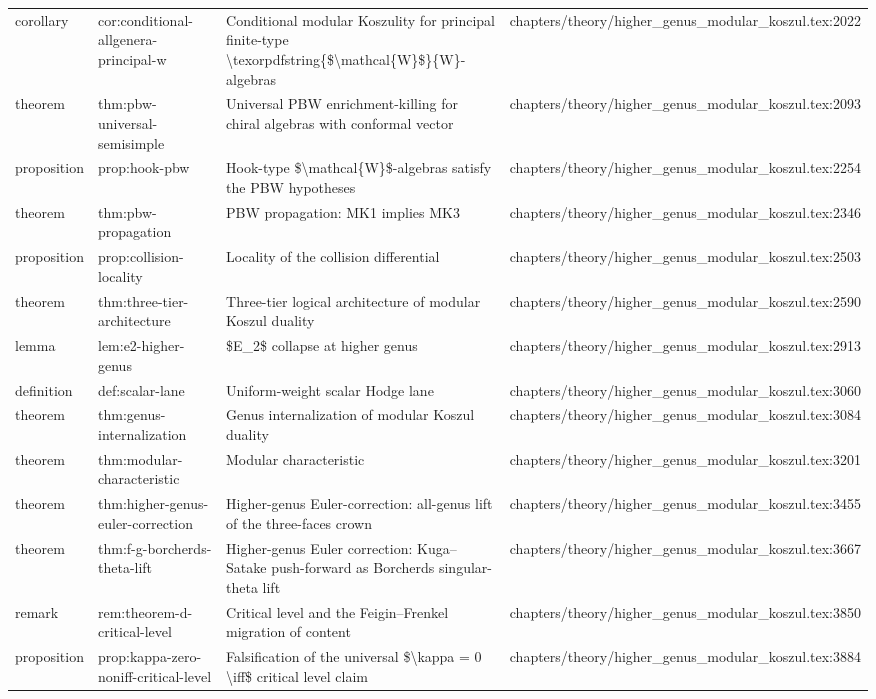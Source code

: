\documentclass[11pt]{article}
\begin{document}
\begin{longtable}{L{0.10\textwidth}L{0.26\textwidth}L{0.42\textwidth}L{0.22\textwidth}}
corollary & cor:cond{}itional-allgenera-principal-w & Cond{}itional modular Koszulity for principal finite-type \textbackslash{}texorpdfstring\{\$\textbackslash{}mathcal\{W\}\$\}\{W\}-algebras & chapters/theory/higher\_genus\_modular\_koszul.tex:2022\\
theorem & thm:pbw-universal-semisimple & Universal PBW enrichment-killing for chiral algebras with conformal vector & chapters/theory/higher\_genus\_modular\_koszul.tex:2093\\
proposition & prop:hook-pbw & Hook-type \$\textbackslash{}mathcal\{W\}\$-algebras satisfy the PBW hypotheses & chapters/theory/higher\_genus\_modular\_koszul.tex:2254\\
theorem & thm:pbw-propagation & PBW propagation: MK1 implies MK3 & chapters/theory/higher\_genus\_modular\_koszul.tex:2346\\
proposition & prop:collision-locality & Locality of the collision differential & chapters/theory/higher\_genus\_modular\_koszul.tex:2503\\
theorem & thm:three-tier-architecture & Three-tier logical architecture of modular Koszul duality & chapters/theory/higher\_genus\_modular\_koszul.tex:2590\\
lemma & lem:e2-higher-genus & \$E\_2\$ collapse at higher genus & chapters/theory/higher\_genus\_modular\_koszul.tex:2913\\
definition & def:scalar-lane & Uniform-weight scalar Hodge lane & chapters/theory/higher\_genus\_modular\_koszul.tex:3060\\
theorem & thm:genus-internalization & Genus internalization of modular Koszul duality & chapters/theory/higher\_genus\_modular\_koszul.tex:3084\\
theorem & thm:modular-characteristic & Modular characteristic & chapters/theory/higher\_genus\_modular\_koszul.tex:3201\\
theorem & thm:higher-genus-euler-correction & Higher-genus Euler-correction: all-genus lift of the three-faces crown & chapters/theory/higher\_genus\_modular\_koszul.tex:3455\\
theorem & thm:f-g-borcherds-theta-lift & Higher-genus Euler correction: Kuga--Satake push-forward as Borcherds singular-theta lift & chapters/theory/higher\_genus\_modular\_koszul.tex:3667\\
remark & rem:theorem-d-critical-level & Critical level and the Feigin--Frenkel migration of content & chapters/theory/higher\_genus\_modular\_koszul.tex:3850\\
proposition & prop:kappa-zero-noniff-critical-level & Falsification of the universal \$\textbackslash{}kappa = 0 \textbackslash{}iff\$ critical level claim & chapters/theory/higher\_genus\_modular\_koszul.tex:3884\\

\end{longtable}
\end{document}
